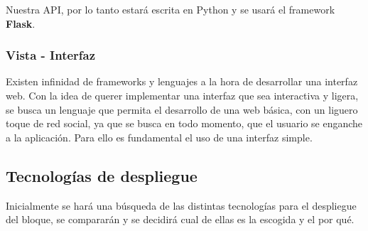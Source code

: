 Nuestra API, por lo tanto estará escrita en Python y se usará el framework \textbf{Flask}.

\subsubsection{Vista - Interfaz}

Existen infinidad de frameworks y lenguajes a la hora de desarrollar una interfaz web. Con la idea de querer implementar una interfaz que sea interactiva y ligera, se busca un lenguaje que permita el desarrollo de una web básica, con un liguero toque de red social, ya que se busca en todo momento, que el usuario se enganche a la aplicación. Para ello es fundamental el uso de una interfaz simple.



\subsection{Tecnologías de despliegue}

Inicialmente se hará una búsqueda de las distintas tecnologías para el despliegue del bloque, se compararán y se decidirá cual de ellas es la escogida y el por qué.